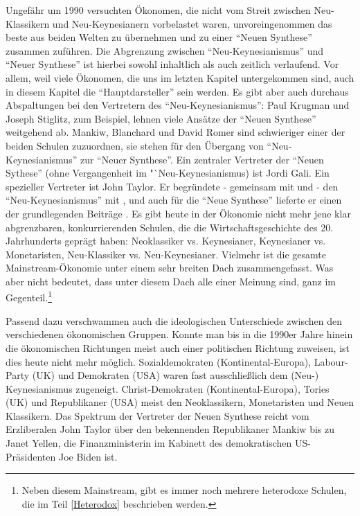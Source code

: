 Ungefähr um 1990 versuchten Ökonomen, die nicht vom Streit zwischen Neu-Klassikern und Neu-Keynesianern vorbelastet waren, unvoreingenommen das beste aus beiden Welten zu übernehmen und zu einer "`Neuen Synthese"' zusammen zuführen. Die Abgrenzung zwischen "`Neu-Keynesianismus"' und "`Neuer Synthese"' ist hierbei sowohl inhaltlich als auch zeitlich verlaufend. Vor allem, weil viele Ökonomen, die uns im letzten Kapitel untergekommen sind, auch in diesem Kapitel die "`Hauptdarsteller"' sein werden. Es gibt aber auch durchaus Abspaltungen bei den Vertretern des "`Neu-Keynesianismus"': Paul Krugman und Joseph Stiglitz, zum Beispiel, lehnen viele Ansätze der "`Neuen Synthese"' weitgehend ab. Mankiw, Blanchard und David Romer sind schwieriger einer der beiden Schulen zuzuordnen, sie stehen für den Übergang von "`Neu-Keynesianismus"' zur "`Neuer Synthese"'. Ein zentraler Vertreter der "`Neuen Sythese"' (ohne Vergangenheit im "`Neu-Keynesianismus) ist Jordi Gali. Ein spezieller Vertreter ist John Taylor. Er begründete - gemeinsam mit \textcite{Phelps1968} und \textcite{Fischer1977} - den "`Neu-Keynesianismus"' mit \parencite{Taylor1977}, und auch für die "`Neue Synthese"' lieferte er einen der grundlegenden Beiträge \parencite{Taylor1993}. Es gibt heute in der Ökonomie nicht mehr jene klar abgrenzbaren, konkurrierenden Schulen, die die Wirtschaftsgeschichte des 20. Jahrhunderts geprägt haben: Neoklassiker vs. Keynesianer, Keynesianer vs. Monetaristen, Neu-Klassiker vs. Neu-Keynesianer. Vielmehr ist die gesamte Mainstream-Ökonomie unter einem sehr breiten Dach zusammengefasst. Was aber nicht bedeutet, dass unter diesem Dach alle einer Meinung sind, ganz im Gegenteil.\footnote{Neben diesem Mainstream, gibt es immer noch mehrere heterodoxe Schulen, die im Teil \ref{Heterodox} beschrieben werden.}

Passend dazu verschwammen auch die ideologischen Unterschiede zwischen den verschiedenen ökonomischen Gruppen. Konnte man bis in die 1990er Jahre hinein die ökonomischen Richtungen meist auch einer politischen Richtung zuweisen, ist dies heute nicht mehr möglich. Sozialdemokraten (Kontinental-Europa), Labour-Party (UK) und Demokraten (USA) waren fast ausschließlich dem (Neu-) Keynesianismus zugeneigt. Christ-Demokraten (Kontinental-Europa), Tories (UK) und Republikaner (USA) meist den Neoklassikern,  Monetaristen und Neuen Klassikern. Das Spektrum der Vertreter der Neuen Synthese reicht vom Erzliberalen John Taylor über den bekennenden Republikaner Mankiw bis zu Janet Yellen, die Finanzministerin im Kabinett des demokratischen US-Präsidenten Joe Biden ist. 

